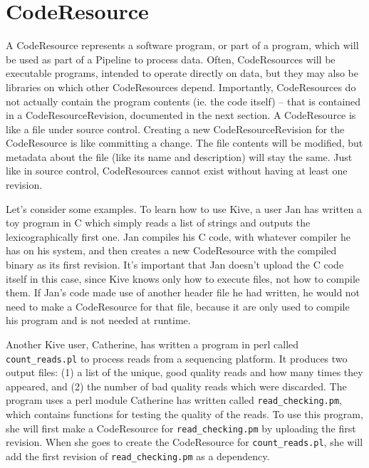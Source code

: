 \documentclass[12pt]{article}
\newcommand{\code}[1]{\texttt{#1}}
\begin{document}
\def\nodedist{1}
\def\sep{0.2}

\section*{CodeResource}

A CodeResource represents a software program, or part of a program, which will
be used as part of a Pipeline to process data. Often, CodeResources will be
executable programs, intended to operate directly on data, but they may also be
libraries on which other CodeResources depend. Importantly, CodeResources do
not actually contain the program contents (ie. the code itself) -- that is
contained in a CodeResourceRevision, documented in the next section. A
CodeResource is like a file under source control. Creating a new
CodeResourceRevision for the CodeResource is like committing a change. The file
contents will be modified, but metadata about the file (like its name and
description) will stay the same. Just like in source control, CodeResources
cannot exist without having at least one revision.

Let's consider some examples. To learn how to use Kive, a user Jan has
written a toy program in C which simply reads a list of strings and outputs the
lexicographically first one. Jan compiles his C code, with whatever compiler he
has on his system, and then creates a new CodeResource with the compiled binary
as its first revision. It's important that Jan doesn't upload the C code itself
in this case, since Kive knows only how to execute files, not how to
compile them. If Jan's code made use of another header file he had written, he
would not need to make a CodeResource for that file, because it are only used
to compile his program and is not needed at runtime. 

Another Kive user, Catherine, has written a program in perl called
\code{count\_reads.pl} to process reads from a sequencing platform. It produces
two output files: (1) a list of the unique, good quality reads and how many
times they appeared, and (2) the number of bad quality reads which were
discarded. The program uses a perl module Catherine has written called
\code{read\_checking.pm}, which contains functions for testing the quality of
the reads. To use this program, she will first make a CodeResource for
\code{read\_checking.pm} by uploading the first revision. When she goes to
create the CodeResource for \code{count\_reads.pl}, she will add the first
revision of \code{read\_checking.pm} as a dependency.
\end{document}
